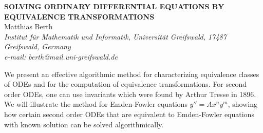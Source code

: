 \documentclass[11pt, draft]{article}
\begin{document}

\begin{center}
{\bf
SOLVING ORDINARY DIFFERENTIAL EQUATIONS BY EQUIVALENCE TRANSFORMATIONS
}\\
\vspace {0.3cm}
{Matthias Berth}\\
{\it \small Institut f\"{u}r Mathematik und Informatik, Universit\"{a}t Greifswald,
17487 Greifswald, Germany \\
e-mail: berth@mail.uni-greifswald.de}
\end{center}
\vspace {0.6cm}
We present an effective algorithmic method for characterizing
equivalence classes of ODEs and for the computation of equivalence
transformations. For second order ODEs, one can use invariants which
were found by Arthur Tresse in 1896. We will illustrate the method for
Emden-Fowler equations $y''=A x^n y^m$, showing how certain second order
ODEs that are equivalent to Emden-Fowler equations with known solution
can be solved algorithmically.
\end{document}
